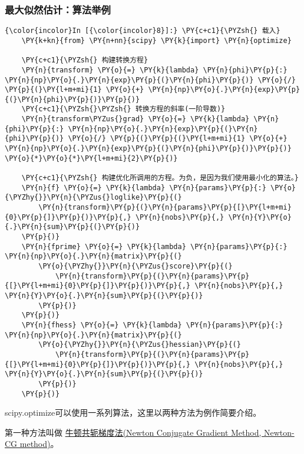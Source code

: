 \subsubsection{最大似然估计：算法举例}
\label{ux6700ux5927ux4f3cux7136ux4f30ux8ba1ux7b97ux6cd5ux4e3eux4f8b}
\begin{Verbatim}[commandchars=\\\{\}]
{\color{incolor}In [{\color{incolor}8}]:} \PY{c+c1}{\PYZsh{} 载入}
    \PY{k+kn}{from} \PY{n+nn}{scipy} \PY{k}{import} \PY{n}{optimize}

    \PY{c+c1}{\PYZsh{} 构建转换方程}
    \PY{n}{transform} \PY{o}{=} \PY{k}{lambda} \PY{n}{phi}\PY{p}{:} \PY{n}{np}\PY{o}{.}\PY{n}{exp}\PY{p}{(}\PY{n}{phi}\PY{p}{)} \PY{o}{/} \PY{p}{(}\PY{l+m+mi}{1} \PY{o}{+} \PY{n}{np}\PY{o}{.}\PY{n}{exp}\PY{p}{(}\PY{n}{phi}\PY{p}{)}\PY{p}{)}
    \PY{c+c1}{\PYZsh{}\PYZsh{} 转换方程的斜率(一阶导数)}
    \PY{n}{transform\PYZus{}grad} \PY{o}{=} \PY{k}{lambda} \PY{n}{phi}\PY{p}{:} \PY{n}{np}\PY{o}{.}\PY{n}{exp}\PY{p}{(}\PY{n}{phi}\PY{p}{)} \PY{o}{/} \PY{p}{(}\PY{p}{(}\PY{l+m+mi}{1} \PY{o}{+} \PY{n}{np}\PY{o}{.}\PY{n}{exp}\PY{p}{(}\PY{n}{phi}\PY{p}{)}\PY{p}{)} \PY{o}{*}\PY{o}{*}\PY{l+m+mi}{2}\PY{p}{)}

    \PY{c+c1}{\PYZsh{} 构建优化所调用的方程。为负，是因为我们使用最小化的算法。}
    \PY{n}{f} \PY{o}{=} \PY{k}{lambda} \PY{n}{params}\PY{p}{:} \PY{o}{\PYZhy{}}\PY{n}{\PYZus{}loglike}\PY{p}{(}
        \PY{n}{transform}\PY{p}{(}\PY{n}{params}\PY{p}{[}\PY{l+m+mi}{0}\PY{p}{]}\PY{p}{)}\PY{p}{,} \PY{n}{nobs}\PY{p}{,} \PY{n}{Y}\PY{o}{.}\PY{n}{sum}\PY{p}{(}\PY{p}{)}
    \PY{p}{)}
    \PY{n}{fprime} \PY{o}{=} \PY{k}{lambda} \PY{n}{params}\PY{p}{:} \PY{n}{np}\PY{o}{.}\PY{n}{matrix}\PY{p}{(}
        \PY{o}{\PYZhy{}}\PY{n}{\PYZus{}score}\PY{p}{(}
            \PY{n}{transform}\PY{p}{(}\PY{n}{params}\PY{p}{[}\PY{l+m+mi}{0}\PY{p}{]}\PY{p}{)}\PY{p}{,} \PY{n}{nobs}\PY{p}{,} \PY{n}{Y}\PY{o}{.}\PY{n}{sum}\PY{p}{(}\PY{p}{)}
        \PY{p}{)}
    \PY{p}{)}
    \PY{n}{fhess} \PY{o}{=} \PY{k}{lambda} \PY{n}{params}\PY{p}{:} \PY{n}{np}\PY{o}{.}\PY{n}{matrix}\PY{p}{(}
        \PY{o}{\PYZhy{}}\PY{n}{\PYZus{}hessian}\PY{p}{(}
            \PY{n}{transform}\PY{p}{(}\PY{n}{params}\PY{p}{[}\PY{l+m+mi}{0}\PY{p}{]}\PY{p}{)}\PY{p}{,} \PY{n}{nobs}\PY{p}{,} \PY{n}{Y}\PY{o}{.}\PY{n}{sum}\PY{p}{(}\PY{p}{)}
        \PY{p}{)}
    \PY{p}{)}
\end{Verbatim}

scipy.optimize可以使用一系列算法，这里以两种方法为例作简要介绍。

第一种方法叫做
\href{https://en.wikipedia.org/wiki/Nonlinear_conjugate_gradient_method}{牛顿共轭梯度法(Newton
Conjugate Gradient Method, Newton-CG method)}。

